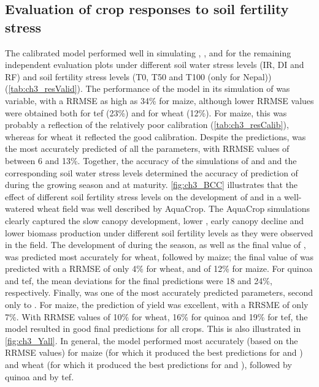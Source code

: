 \subsection{Evaluation of crop responses to soil fertility stress}
The calibrated model performed well in simulating \SWCr, \CC, \B and \Y for the remaining independent evaluation plots under different soil water stress levels (IR, DI and RF) and soil fertility stress levels (T0, T50 and T100 (only for Nepal)) (\autoref{tab:ch3_resValid}). The performance of the model in its simulation of \CC was variable, with a RRMSE as high as 34\% for maize, although lower RRMSE values were obtained both for tef (23\%) and for wheat (12\%). For maize, this was probably a reflection of the relatively poor \CC calibration (\autoref{tab:ch3_resCalib}), whereas for wheat it reflected the good \CC calibration. Despite the \CC predictions, \SWCr was the most accurately predicted of all the parameters, with RRMSE values of between 6 and 13\%. Together, the accuracy of the simulations of \CC and \SWCr and the corresponding soil water stress levels determined the accuracy of prediction of \B during the growing season and at maturity. \autoref{fig:ch3_BCC} illustrates that the effect of different soil fertility stress levels on the development of \CC and \B in a well-watered wheat field was well described by AquaCrop. The AquaCrop simulations clearly captured the slow canopy development, lower \CCx, early canopy decline and lower biomass production under different soil fertility levels as they were observed in the field. The development of \B during the season, as well as the final value of \B, was predicted most accurately for wheat, followed by maize; the final value of \B was predicted with a RRMSE of only 4\% for wheat, and of 12\% for maize. For quinoa and tef, the mean deviations for the final \B predictions were 18 and 24\%, respectively. Finally, \Y was one of the most accurately predicted parameters, second only to \SWCr. For maize, the prediction of yield was excellent, with a RRSME of only 7\%. With RRMSE values of 10\% for wheat, 16\% for quinoa and 19\% for tef, the model resulted in good final \Y predictions for all crops. This is also illustrated in \autoref{fig:ch3_Yall}. In general, the model performed most accurately (based on the RRMSE values) for maize (for which it produced the best predictions for \Y and \SWCr) and wheat (for which it produced the best predictions for \B and \CC), followed by quinoa and by tef. 

